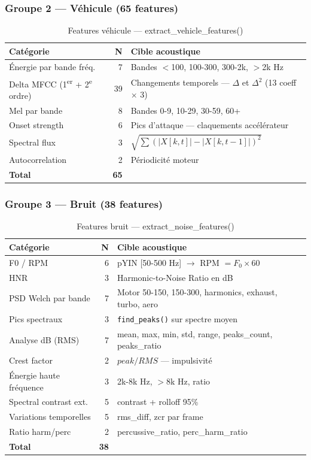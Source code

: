 \documentclass[11pt,a4paper]{article}
\newcommand{\code}[1]{\texttt{\small #1}}
\begin{document}
\subsubsection{Groupe 2 — Véhicule (65 features)}

\begin{table}[htbp]
\centering
\begin{tabular}{@{}lrp{8cm}@{}}
\toprule
\textbf{Catégorie} & \textbf{N} & \textbf{Cible acoustique} \\
\midrule
Énergie par bande fréq. & 7 & Bandes $<$100, 100-300, 300-2k, $>$2k Hz \\
Delta MFCC (1\textsuperscript{er} + 2\textsuperscript{e} ordre) & 39 & Changements temporels — $\Delta$ et $\Delta^2$ (13 coeff $\times$ 3) \\
Mel par bande & 8 & Bandes 0-9, 10-29, 30-59, 60+ \\
Onset strength & 6 & Pics d'attaque — claquements accélérateur \\
Spectral flux & 3 & $\sqrt{\sum(|X[k,t]| - |X[k,t{-}1]|)^2}$ \\
Autocorrelation & 2 & Périodicité moteur \\
\midrule
\textbf{Total} & \textbf{65} & \\
\bottomrule
\end{tabular}
\caption{Features véhicule — extract\_vehicle\_features()}
\end{table}

\subsubsection{Groupe 3 — Bruit (38 features)}

\begin{table}[htbp]
\centering
\begin{tabular}{@{}lrp{8cm}@{}}
\toprule
\textbf{Catégorie} & \textbf{N} & \textbf{Cible acoustique} \\
\midrule
F0 / RPM & 6 & pYIN [50-500 Hz] $\rightarrow$ RPM $= F_0 \times 60$ \\
HNR & 3 & Harmonic-to-Noise Ratio en dB \\
PSD Welch par bande & 7 & Motor 50-150, 150-300, harmonics, exhaust, turbo, aero \\
Pics spectraux & 3 & \code{find\_peaks()} sur spectre moyen \\
Analyse dB (RMS) & 7 & mean, max, min, std, range, peaks\_count, peaks\_ratio \\
Crest factor & 2 & $peak / RMS$ — impulsivité \\
Énergie haute fréquence & 3 & 2k-8k Hz, $>$8k Hz, ratio \\
Spectral contrast ext. & 5 & contrast + rolloff 95\% \\
Variations temporelles & 5 & rms\_diff, zcr par frame \\
Ratio harm/perc & 2 & percussive\_ratio, perc\_harm\_ratio \\
\midrule
\textbf{Total} & \textbf{38} & \\
\bottomrule
\end{tabular}
\caption{Features bruit — extract\_noise\_features()}
\end{table}
\end{document}
